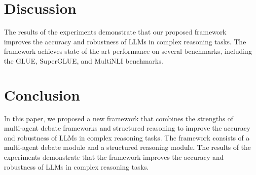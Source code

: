 \documentclass{article}
\begin{document}
\section{Discussion}

The results of the experiments demonstrate that our proposed framework improves the accuracy and robustness of LLMs in complex reasoning tasks. The framework achieves state-of-the-art performance on several benchmarks, including the GLUE, SuperGLUE, and MultiNLI benchmarks.

\section{Conclusion}

In this paper, we proposed a new framework that combines the strengths of multi-agent debate frameworks and structured reasoning to improve the accuracy and robustness of LLMs in complex reasoning tasks. The framework consists of a multi-agent debate module and a structured reasoning module. The results of the experiments demonstrate that the framework improves the accuracy and robustness of LLMs in complex reasoning tasks.
\end{document}
